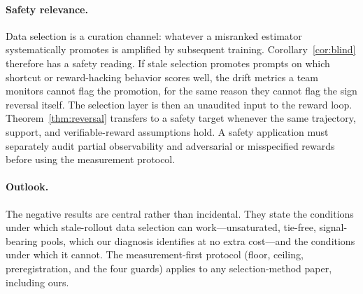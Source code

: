 \documentclass[11pt]{article}
\begin{document}
\paragraph{Safety relevance.} Data selection is a curation channel:
whatever a misranked estimator systematically promotes is amplified by
subsequent training. Corollary~\ref{cor:blind} therefore has a safety
reading. If stale selection promotes prompts on which shortcut or
reward-hacking behavior scores well, the drift metrics a team monitors
cannot flag the promotion, for the same reason they cannot flag the sign
reversal itself. The selection layer is then an unaudited input to the
reward loop. Theorem~\ref{thm:reversal} transfers to a safety target whenever
the same trajectory, support, and verifiable-reward assumptions hold. A
safety application must separately audit partial observability and
adversarial or misspecified rewards before using the measurement protocol.

\paragraph{Outlook.} The negative results are central rather than
incidental. They state the conditions under which stale-rollout data
selection can work---unsaturated, tie-free, signal-bearing pools, which our
diagnosis identifies at no extra cost---and the conditions under which it
cannot. The measurement-first protocol (floor, ceiling, preregistration, and
the four guards) applies to any selection-method paper, including ours.
\end{document}
